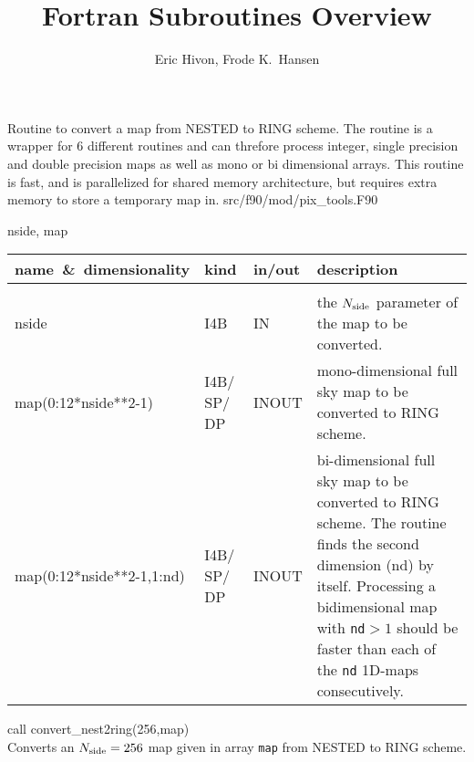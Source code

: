 
\sloppy


\title{\healpix Fortran Subroutines Overview}
 \section[convert\_nest2ring*]{ }
\label{sub:convert_nest2ring}
\author{Eric Hivon, Frode K.~Hansen}


\begin{facility}
{Routine to convert a \healpix map from NESTED to RING scheme. \newline
The routine is a
  wrapper for 6 different routines and can threfore process
  integer, single precision and double precision maps as well as mono or bi
  dimensional arrays. \newline This routine is fast, and is parallelized for shared memory
architecture, but requires extra memory to store a temporary map in. }
{src/f90/mod/pix\_tools.F90}
\end{facility}

\begin{f90format}
{nside, map}
\end{f90format}

\begin{arguments}
{
\begin{tabular}{p{0.4\hsize} p{0.05\hsize} p{0.1\hsize} p{0.35\hsize}} \hline  
\textbf{name~\&~dimensionality} & \textbf{kind} & \textbf{in/out} & \textbf{description} \\ \hline
                   &   &   &                           \\ %
nside & I4B & IN & the ${N_{\rm side}}$ parameter of the map to be converted. \\
map(0:12*nside**2-1) & I4B/ SP/ DP & INOUT & mono-dimensional full sky map to be converted to RING scheme. \\
map(0:12*nside**2-1,1:nd) & I4B/ SP/ DP & INOUT & bi-dimensional full sky map to
                   be converted to RING scheme. The routine finds the second
                   dimension (nd) by itself. Processing a bidimensional map with
{\tt nd}$>1$ should be
                   faster than each of the {\tt nd} 1D-maps consecutively.
\end{tabular}
}
\end{arguments}

\begin{example}
{
call convert\_nest2ring(256,map)  \\
}
{
Converts an ${N_{\rm side}}=256$ map given in array {\tt map} from NESTED to RING scheme.
}
\end{example}

